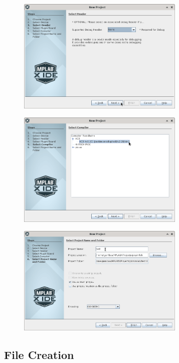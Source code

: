 \begin{figure}[H]
\center
\includegraphics[width=0.71\textwidth]{img/hmd/mplab13.png} 
\end{figure} 

\begin{figure}[H]
\center
\includegraphics[width=0.71\textwidth]{img/hmd/mplab14.png} 
\end{figure} 

\begin{figure}[H]
\center
\includegraphics[width=0.71\textwidth]{img/hmd/mplab15.png} 
\end{figure} 


\subsection{File Creation}

